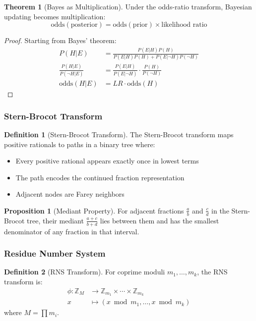 \documentclass[12pt,a4paper]{article}
\theoremstyle{definition}
\newtheorem{definition}{Definition}
\newtheorem{theorem}{Theorem}
\newtheorem{proposition}{Proposition}
\begin{document}
\begin{theorem}[Bayes as Multiplication]
Under the odds-ratio transform, Bayesian updating becomes multiplication:
\begin{equation}
\text{odds}(\text{posterior}) = \text{odds}(\text{prior}) \times \text{likelihood ratio}
\end{equation}
\end{theorem}

\begin{proof}
Starting from Bayes' theorem:
\begin{align}
P(H|E) &= \frac{P(E|H)P(H)}{P(E|H)P(H) + P(E|\neg H)P(\neg H)}\\
\frac{P(H|E)}{P(\neg H|E)} &= \frac{P(E|H)}{P(E|\neg H)} \cdot \frac{P(H)}{P(\neg H)}\\
\text{odds}(H|E) &= LR \cdot \text{odds}(H)
\end{align}
\end{proof}

\subsubsection{Stern-Brocot Transform}
\begin{definition}[Stern-Brocot Transform]
The Stern-Brocot transform maps positive rationals to paths in a binary tree where:
\begin{itemize}
\item Every positive rational appears exactly once in lowest terms
\item The path encodes the continued fraction representation
\item Adjacent nodes are Farey neighbors
\end{itemize}
\end{definition}

\begin{proposition}[Mediant Property]
For adjacent fractions $\frac{a}{b}$ and $\frac{c}{d}$ in the Stern-Brocot tree, their mediant $\frac{a+c}{b+d}$ lies between them and has the smallest denominator of any fraction in that interval.
\end{proposition}

\subsubsection{Residue Number System}
\begin{definition}[RNS Transform]
For coprime moduli $m_1, \ldots, m_k$, the RNS transform is:
\begin{align}
\phi: \mathbb{Z}_M &\to \mathbb{Z}_{m_1} \times \cdots \times \mathbb{Z}_{m_k}\\
x &\mapsto (x \bmod m_1, \ldots, x \bmod m_k)
\end{align}
where $M = \prod m_i$.
\end{definition}
\end{document}
